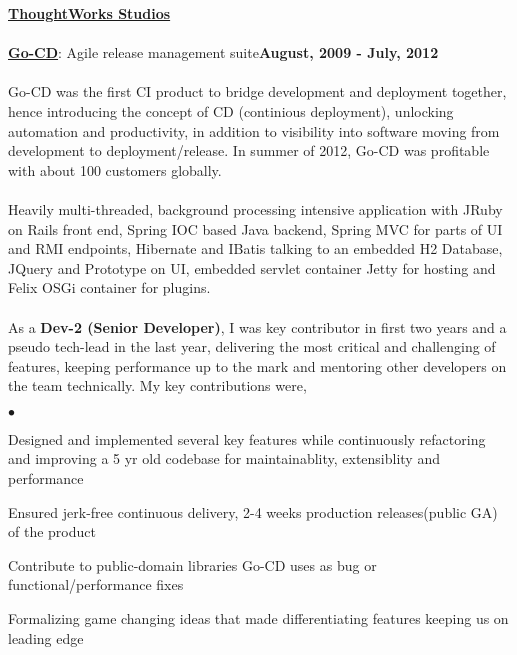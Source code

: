 \documentclass[margin,line]{res}
\newenvironment{list2}{
  \begin{list}{$\bullet$}{%
      \setlength{\itemsep}{0in}
      \setlength{\parsep}{0in} \setlength{\parskip}{0in}
      \setlength{\topsep}{0in} \setlength{\partopsep}{0in} 
      \setlength{\leftmargin}{0.2in}}}{\end{list}}
\begin{document}
\begin{resume}
{\underline {\bf ThoughtWorks Studios}}\\
\\
\href{https://www.thoughtworks.com/go/}{\bf Go-CD}: Agile release management suite\hfill {\bf August, 2009 - July, 2012}\\
\vspace{-.2cm}\\
Go-CD was the first CI product to bridge development and deployment together, hence introducing the concept of CD (continious deployment), unlocking automation and productivity, in addition to visibility into software moving from development to deployment/release. In summer of 2012, Go-CD was profitable with about 100 customers globally.\\
\\
Heavily multi-threaded, background processing intensive application with JRuby on Rails front end, Spring IOC based Java backend, Spring MVC for parts of UI and RMI endpoints, Hibernate and IBatis talking to an embedded H2 Database, JQuery and Prototype on UI, embedded servlet container Jetty for hosting and Felix OSGi container for plugins.\\
\\
As a {\bf Dev-2 (Senior Developer)}, I was key contributor in first two years and a pseudo tech-lead in the last year, delivering the most critical and challenging of features, keeping performance up to the mark and mentoring other developers on the team technically. My key contributions were,\\
\begin{list2}
\item Designed and implemented several key features while continuously refactoring and improving a 5 yr old codebase for maintainablity, extensiblity and performance
\item Ensured jerk-free continuous delivery, 2-4 weeks production releases(public GA) of the product
\item Contribute to public-domain libraries Go-CD uses as bug or functional/performance fixes
\item Formalizing game changing ideas that made differentiating features keeping us on leading edge
\end{list2}


\end{resume}
\end{document}
